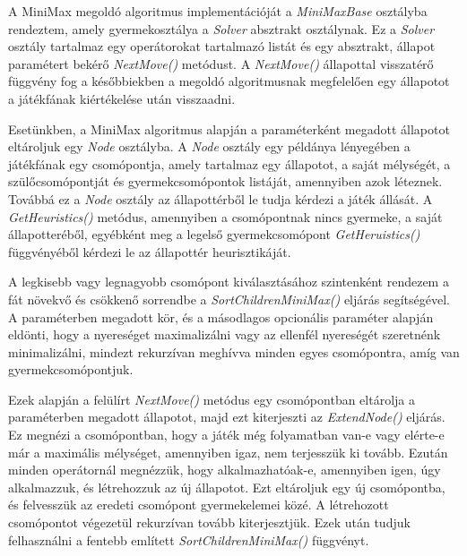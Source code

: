 \documentclass[
]{thesis-ekf}
\theoremstyle{definition}
\theoremstyle{remark}
\begin{document}
A MiniMax megoldó algoritmus implementációját a \emph{MiniMaxBase} osztályba rendeztem, amely gyermekosztálya a \emph{Solver} absztrakt osztálynak. Ez a \emph{Solver} osztály tartalmaz egy operátorokat tartalmazó listát és egy absztrakt, állapot paramétert bekérő \emph{NextMove()} metódust. A \emph{NextMove()} állapottal visszatérő függvény fog a későbbiekben a megoldó algoritmusnak megfelelően egy állapotot a játékfának kiértékelése után visszaadni.



Esetünkben, a MiniMax algoritmus alapján a paraméterként megadott állapotot eltároljuk egy \emph{Node} osztályba. A \emph{Node} osztály egy példánya lényegében a játékfának egy csomópontja, amely tartalmaz egy állapotot, a saját mélységét, a szülőcsomópontját és gyermekcsomópontok listáját, amennyiben azok léteznek. Továbbá ez a \emph{Node} osztály az állapottérből le tudja kérdezi a játék állását. A \emph{GetHeuristics()} metódus, amennyiben a csomópontnak nincs gyermeke, a saját állapotteréből, egyébként meg a legelső gyermekcsomópont \emph{GetHeruistics()} függvényéből kérdezi le az állapottér heurisztikáját. 

A legkisebb vagy legnagyobb csomópont kiválasztásához szintenként rendezem a fát növekvő és csökkenő sorrendbe a \emph{SortChildrenMiniMax()} eljárás segítségével. A paraméterben megadott kör, és a másodlagos opcionális paraméter alapján eldönti, hogy a nyereséget maximalizálni vagy  az ellenfél nyereségét szeretnénk minimalizálni, mindezt rekurzívan meghívva minden egyes csomópontra, amíg van gyermekcsomópontjuk.



Ezek alapján a felülírt \emph{NextMove()} metódus egy csomópontban eltárolja a paraméterben megadott állapotot, majd ezt kiterjeszti az \emph{ExtendNode()} eljárás. Ez megnézi a csomópontban, hogy a játék még folyamatban van-e vagy elérte-e már a maximális mélységet, amennyiben igaz, nem terjesszük ki tovább. Ezután minden operátornál megnézzük, hogy alkalmazhatóak-e, amennyiben igen, úgy alkalmazzuk, és létrehozzuk az új állapotot. Ezt eltároljuk egy új csomópontba, és felvesszük az eredeti csomópont gyermekelemei közé. A létrehozott csomópontot végezetül rekurzívan tovább kiterjesztjük. Ezek után tudjuk felhasználni a fentebb említett \emph{SortChildrenMiniMax()} függvényt.
\end{document}
